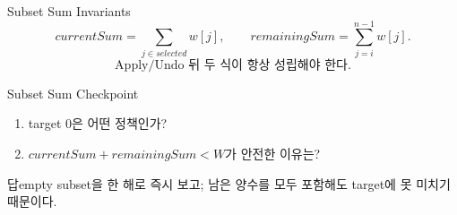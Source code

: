 \begin{frame}{Subset Sum Invariants}
\[
currentSum=\sum_{j\in selected}w[j],
\qquad
remainingSum=\sum_{j=i}^{n-1}w[j].
\]
\[
\text{Apply/Undo 뒤 두 식이 항상 성립해야 한다.}
\]
\end{frame}
\begin{frame}{Subset Sum Checkpoint}
\begin{enumerate}\item target 0은 어떤 정책인가?\item \(currentSum+remainingSum<W\)가 안전한 이유는?\end{enumerate}
\begin{exampleblock}{답}empty subset을 한 해로 즉시 보고; 남은 양수를 모두 포함해도 target에 못 미치기 때문이다.\end{exampleblock}
\end{frame}
